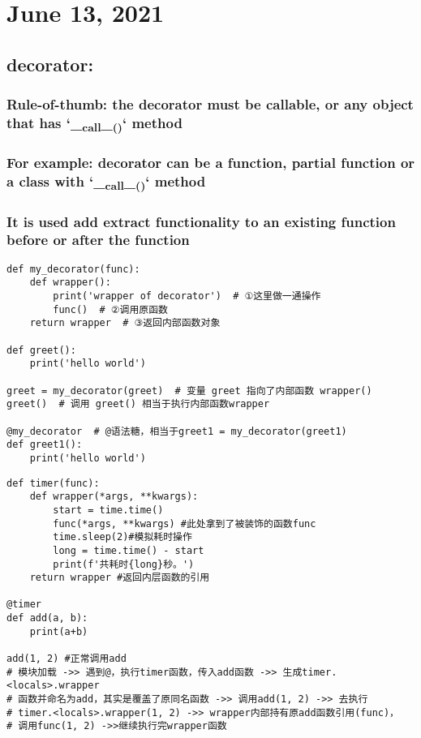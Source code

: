 \documentclass[11pt]{article}
\begin{document}
\section{June 13, 2021}
\label{sec:org02b2cb9}

\subsection{decorator:}
\label{sec:org4e4e1c2}
\subsubsection{Rule-of-thumb: the decorator must be callable, or any object that has `\_\textsubscript{call}\_\textsubscript{()}` method}
\label{sec:org562c37d}
\subsubsection{For example: decorator can be a function, partial function or a class with `\_\textsubscript{call}\_\textsubscript{()}` method}
\label{sec:org8f99927}
\subsubsection{It is used add extract functionality to an existing function before or after the function}
\label{sec:org9465de4}
\begin{verbatim}
def my_decorator(func):  
    def wrapper():
        print('wrapper of decorator')  # ①这里做一通操作
        func()  # ②调用原函数
    return wrapper  # ③返回内部函数对象

def greet():
    print('hello world')

greet = my_decorator(greet)  # 变量 greet 指向了内部函数 wrapper()
greet()  # 调用 greet() 相当于执行内部函数wrapper

@my_decorator  # @语法糖，相当于greet1 = my_decorator(greet1)
def greet1():    
    print('hello world') 
\end{verbatim}

\begin{verbatim}
def timer(func):
    def wrapper(*args, **kwargs):
        start = time.time()
        func(*args, **kwargs) #此处拿到了被装饰的函数func
        time.sleep(2)#模拟耗时操作
        long = time.time() - start
        print(f'共耗时{long}秒。')
    return wrapper #返回内层函数的引用

@timer
def add(a, b):
    print(a+b)

add(1, 2) #正常调用add
# 模块加载 ->> 遇到@，执行timer函数，传入add函数 ->> 生成timer.<locals>.wrapper
# 函数并命名为add，其实是覆盖了原同名函数 ->> 调用add(1, 2) ->> 去执行
# timer.<locals>.wrapper(1, 2) ->> wrapper内部持有原add函数引用(func)，
# 调用func(1, 2) ->>继续执行完wrapper函数
\end{verbatim}
\end{document}
